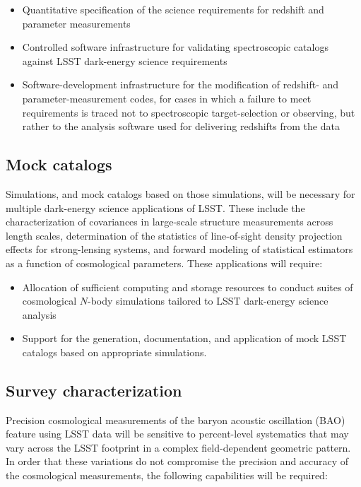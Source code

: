 \begin{itemize}
\item Quantitative specification of the science requirements for redshift and parameter measurements
\item Controlled software infrastructure for validating spectroscopic catalogs 
against LSST dark-energy science requirements
\item Software-development infrastructure for the modification of redshift- and parameter-measurement codes, 
for cases in which a failure to meet requirements is traced not to spectroscopic target-selection or 
observing, but rather to the analysis software used for delivering redshifts from the data
\end{itemize}

\subsection{Mock catalogs}

Simulations, and mock catalogs based on those simulations, will be necessary for multiple 
dark-energy science applications of LSST. These include the characterization of covariances in 
large-scale structure measurements across length scales, determination of the statistics of 
line-of-sight density projection effects for strong-lensing systems, and forward modeling 
of statistical estimators as a function of cosmological parameters. These applications will require: 

\begin{itemize}
\item Allocation of sufficient computing and storage resources to conduct suites of cosmological 
$N$-body simulations tailored to LSST dark-energy science analysis
\item Support for the generation, documentation, and application of mock LSST catalogs based on 
appropriate simulations.
\end{itemize}

\subsection{Survey characterization}

Precision cosmological measurements of the baryon acoustic oscillation (BAO) feature using LSST
data will be sensitive to percent-level systematics that may vary across the LSST footprint in a 
complex field-dependent geometric pattern. In order that these variations do not compromise 
the precision and accuracy of the cosmological measurements, the following capabilities 
will be required: 

